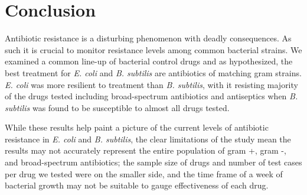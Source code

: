 \documentclass[11pt, twocolumn]{article}
\begin{document}
\section{Conclusion}

Antibiotic resistance is a disturbing phenomenon with deadly consequences. As such it is crucial to monitor resistance levels among common bacterial strains. We examined a common line-up of bacterial control drugs and as hypothesized, the best treatment for \textit{E. coli} and \textit{B. subtilis} are antibiotics of matching gram strains. \textit{E. coli} was more resilient to treatment than \textit{B. subtilis}, with it resisting majority of the drugs tested including broad-spectrum antibiotics and antiseptics when \textit{B. subtilis} was found to be susceptible to almost all drugs tested. 

While these results help paint a picture of the current levels of antibiotic resistance in \textit{E. coli} and\textit{ B. subtilis}, the clear limitations of the study mean the results may not accurately represent the entire population of gram +, gram -, and broad-spectrum antibiotics; the sample size of drugs and number of test cases per drug we tested were on the smaller side, and the time frame of a week of bacterial growth may not be suitable to gauge effectiveness of each drug. 




\end{document}
